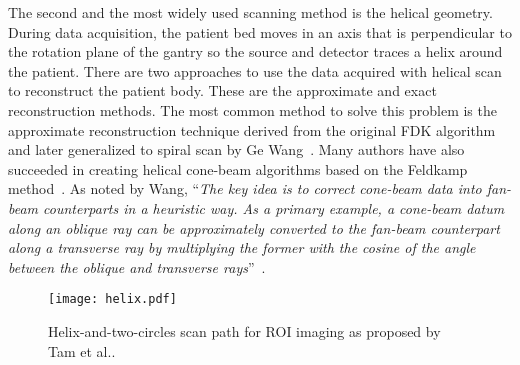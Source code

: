 The second and the most widely used scanning method is the helical geometry.  During data acquisition, the patient bed moves in an axis that is perpendicular to the rotation plane of the gantry so the source and detector traces a helix around the patient.  There are two approaches to use the data acquired with helical scan to reconstruct the patient body.  These are the approximate and exact reconstruction methods.  The most common method to solve this problem is the approximate reconstruction technique derived from the original FDK algorithm and later generalized to spiral scan by Ge Wang~\citep{Wang1993}.  Many authors have also succeeded in creating helical cone-beam algorithms based on the Feldkamp method~\citep{Wang1992, Kudo1991, Yan1992, Smith1992, Noo1999, Kachelriess2000, Tang2004, Tang2006a, Tang2006b}.  As noted by Wang, ``\textit{The key idea is to correct cone-beam data into fan-beam counterparts in a heuristic way.  As a primary example, a cone-beam datum along an oblique ray can be approximately converted to the fan-beam counterpart along a transverse ray by multiplying the former with the cosine of the angle between the oblique and transverse rays}''~\citep{Wang2007}.

%
\begin{figure}[h]
\texttt{[image: helix.pdf]}
\caption{Helix-and-two-circles scan path for ROI imaging as proposed by Tam et al..}
\label{fig:tam_circle}
\end{figure}
%

